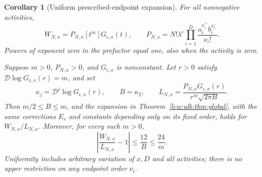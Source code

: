 \documentclass[11pt,letterpaper]{article}
\newtheorem{corollary}[theorem]{Corollary}
\theoremstyle{remark}\newtheorem{remark}[theorem]{Remark}
\begin{document}
\begin{corollary}[Uniform prescribed-endpoint expansion]
\label{lcw:ulb:cor:endpoint}
For all nonnegative activities,
\begin{equation}\label{lcw:ulb:eq:endpoint-exact}
 W_{N,x}=P_{N,x}[t^m]G_{\epsilon,x}(t),\qquad
 P_{N,x}=N!\lambda^\epsilon
          \prod_{i=1}^D\frac{a_i^{x_i^+}b_i^{x_i^-}}{\nu_i!}.
\end{equation}
Powers of exponent zero in the prefactor equal one, also when the
activity is zero.

Suppose $m>0$, $P_{N,x}>0$, and $G_{\epsilon,x}$ is nonconstant.
Let $r>0$ satisfy $\mathcal D\log G_{\epsilon,x}(r)=m$, and set
\[
 \kappa_j=\mathcal D^j\log G_{\epsilon,x}(r),\qquad B=\kappa_2,
 \qquad
 L_{N,x}=\frac{P_{N,x}G_{\epsilon,x}(r)}
               {r^m\sqrt{2\pi B}}.
\]
Then $m/2\le B\le m$, and the expansion in
Theorem~\ref{lcw:ulb:thm:global}, with the same corrections $E_s$ and
constants depending only on its fixed order, holds for $W_{N,x}/L_{N,x}$.
Moreover, for every such $m>0$,
\[
 \left|\frac{W_{N,x}}{L_{N,x}}-1\right|
       \le\frac{12}{B}\le\frac{24}{m}.
\]
Uniformity includes arbitrary variation of $x,D$ and all activities;
there is no upper restriction on any endpoint order $\nu_i$.
\end{corollary}
\end{document}
